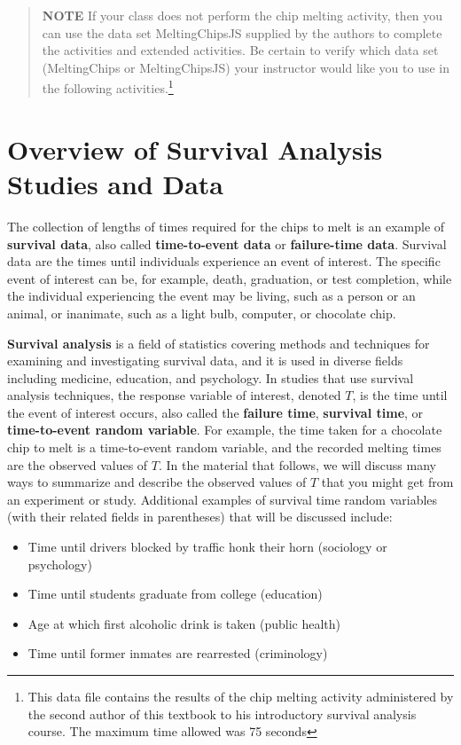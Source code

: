 \documentclass[
]{book}
\providecommand{\tightlist}{%
  \setlength{\itemsep}{0pt}\setlength{\parskip}{0pt}}
\begin{document}
\begin{quote}
\textbf{NOTE}
If your class does not perform the chip melting activity, then you can use the data set MeltingChipsJS
supplied by the authors to complete the activities and extended activities. Be certain to verify which
data set (MeltingChips or MeltingChipsJS) your instructor would like you to use in the following
activities.\footnote{This data file contains the results of the chip melting activity administered by the second author of this textbook to his
  introductory survival analysis course. The maximum time allowed was 75 seconds}
\end{quote}

\hypertarget{overview-of-survival-analysis-studies-and-data}{%
\section{Overview of Survival Analysis Studies and Data}\label{overview-of-survival-analysis-studies-and-data}}

The collection of lengths of times required for the chips to melt is an example of \textbf{survival data}, also called \textbf{time-to-event data} or \textbf{failure-time data}. Survival data are the times until individuals experience an event of interest. The specific event of interest can be, for example, death, graduation, or test completion, while the individual experiencing the event may be living, such as a person or an animal, or inanimate, such as a light bulb, computer, or chocolate chip.

\textbf{Survival analysis} is a field of statistics covering methods and techniques for examining and investigating survival data, and it is used in diverse fields including medicine, education, and psychology. In studies that use survival analysis techniques, the response variable of interest, denoted \(T\), is the time until the event of interest occurs, also called the \textbf{failure time}, \textbf{survival time}, or \textbf{time-to-event random variable}. For example, the time taken for a chocolate chip to melt is a time-to-event random variable, and the recorded melting times are the observed values of \(T\). In the material that follows, we will discuss many ways to summarize and describe the observed values of \(T\) that you might get from an experiment or study. Additional examples of survival time random variables (with their related fields in parentheses) that will be discussed include:

\begin{itemize}
\tightlist
\item
  Time until drivers blocked by traffic honk their horn (sociology or psychology)\\
\item
  Time until students graduate from college (education)\\
\item
  Age at which first alcoholic drink is taken (public health)\\
\item
  Time until former inmates are rearrested (criminology)
\end{itemize}
\end{document}

